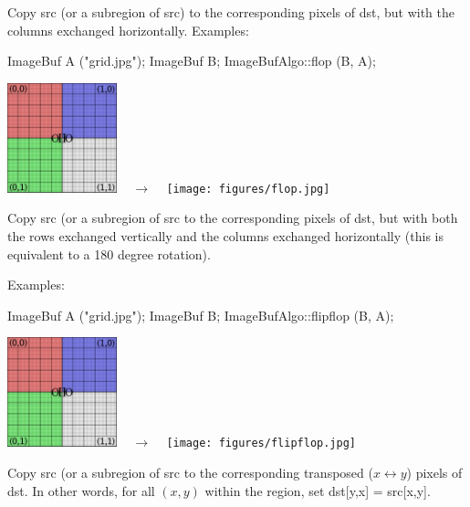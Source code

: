  
Copy {\cf src} (or a subregion of {\cf src}) to the corresponding pixels
of {\cf dst}, but with the columns exchanged horizontally.
\smallskip
\noindent Examples:
\begin{code}
    ImageBuf A ("grid.jpg");
    ImageBuf B;
    ImageBufAlgo::flop (B, A);
\end{code}
\spc \includegraphics[width=1.25in]{figures/grid-small.jpg} 
~ {\Huge $\rightarrow$} ~
\texttt{[image: figures/flop.jpg]} \\
\apiend


 
Copy {\cf src} (or a subregion of {\cf src} to the corresponding pixels
of {\cf dst}, but with both the rows exchanged vertically and the
columns exchanged horizontally (this is equivalent to a 180 degree rotation).

\smallskip
\noindent Examples:
\begin{code}
    ImageBuf A ("grid.jpg");
    ImageBuf B;
    ImageBufAlgo::flipflop (B, A);
\end{code}
\spc \includegraphics[width=1.25in]{figures/grid-small.jpg} 
~ {\Huge $\rightarrow$} ~
\texttt{[image: figures/flipflop.jpg]} \\
\apiend


 
Copy {\cf src} (or a subregion of {\cf src} to the corresponding 
transposed ($x \leftrightarrow y$) pixels
of {\cf dst}.  In other words, for all $(x,y)$ within the region,
set {\cf dst[y,x] = src[x,y]}.

